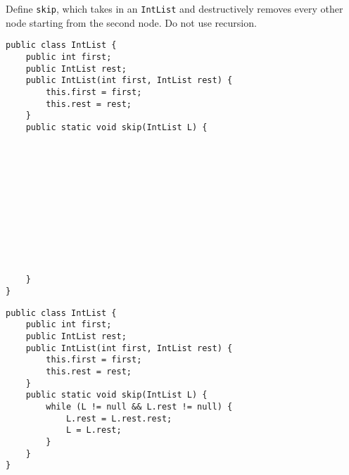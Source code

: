 \begin{blocksection}
\question Define \lstinline$skip$, which takes in an \lstinline$IntList$ and
destructively removes every other node starting from the second node. Do not
use recursion.

\ifprintanswers\else
\begin{lstlisting}
public class IntList {
    public int first;
    public IntList rest;
    public IntList(int first, IntList rest) {
        this.first = first;
        this.rest = rest;
    }
    public static void skip(IntList L) {












    }
}
\end{lstlisting}
\fi

\begin{solution}
\begin{lstlisting}
public class IntList {
    public int first;
    public IntList rest;
    public IntList(int first, IntList rest) {
        this.first = first;
        this.rest = rest;
    }
    public static void skip(IntList L) {
        while (L != null && L.rest != null) {
            L.rest = L.rest.rest;
            L = L.rest;
        }
    }
}
\end{lstlisting}
\end{solution}
\end{blocksection}
